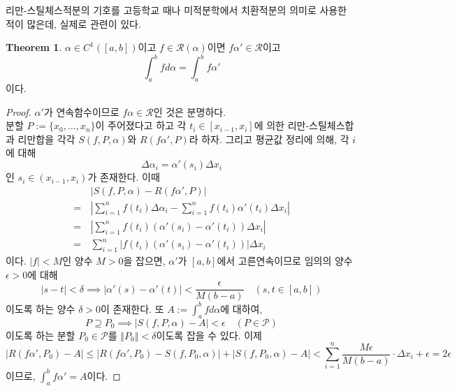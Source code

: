 \documentclass[11pt]{book}
\numberwithin{equation}{chapter}
\def\eps{\epsilon}
\def\calP{\mathcal{P}}
\def\calR{\mathcal{R}}
\newcommand{\abs}[1]{\left\vert#1\right\vert}
\newcommand{\norm}[1]{\left\Vert#1\right\Vert}
\theoremstyle{definition}
\newtheorem{thm}{Theorem}[section]
\begin{document}
리만-스틸체스적분의 기호를 고등학교 때나 미적분학에서 치환적분의 의미로 사용한 적이 많은데, 실제로 관련이 있다.

\begin{thm} \label{9.3.12}
    \(\alpha \in C^1([a, b])\)이고 \(f \in \calR(\alpha)\)이면 \(f \alpha' \in \calR\)이고
    \[
        \int_a^b f d\alpha = \int_a^b f \alpha'
    \]
    이다.
\end{thm}
\begin{proof}
    \(\alpha'\)가 연속함수이므로 \(f\alpha \in \calR\)인 것은 분명하다.\\
    분할 \(P := \{x_0, \ldots, x_n\}\)이 주어졌다고 하고 각 \(t_i \in [x_{i-1}, x_i]\)에 의한 리만-스틸체스합과 리만합을 각각 \(S(f, P, \alpha)\)와 \(R(f\alpha', P)\)라 하자. 그리고 평균값 정리에 의해, 각 \(i\)에 대해
    \[
        \Delta \alpha_i  = \alpha'(s_i) \Delta x_i
    \]
    인 \(s_i \in (x_{i-1}, x_i)\)가 존재한다. 이때
    \begin{align*}
        &\abs{S(f, P, \alpha) - R(f\alpha', P)}\\
        =\,& \abs{\sum_{i=1}^n f(t_i) \Delta\alpha_i - \sum_{i=1}^n f(t_i)\alpha'(t_i) \Delta x_i}\\
        =\,& \abs{\sum_{i=1}^n f(t_i)(\alpha'(s_i) - \alpha'(t_i)) \Delta x_i}\\
        =\,& \sum_{i=1}^n \abs{f(t_i)(\alpha'(s_i) - \alpha'(t_i))} \Delta x_i
    \end{align*}
    이다. \(\abs{f} < M\)인 양수 \(M > 0\)을 잡으면, \(\alpha'\)가 \([a, b]\)에서 고른연속이므로 임의의 양수 \(\eps > 0\)에 대해
    \[
        \abs{s - t} < \delta \implies \abs{\alpha'(s) - \alpha'(t)} < \frac{\eps}{M(b - a)} \quad (s, t \in [a, b])
    \]
    이도록 하는 양수 \(\delta > 0\)이 존재한다. 또 \(\displaystyle A := \int_a^b f d\alpha\)에 대하여,
    \[
        P \supseteq P_0 \implies \abs{S(f, P, \alpha) - A} < \eps \quad (P \in \calP)
    \]
    이도록 하는 분할 \(P_0 \in \calP\)를 \(\norm{P_0} < \delta\)이도록 잡을 수 있다. 이제
    \[
        \abs{R(f\alpha', P_0) - A} \le \abs{R(f\alpha', P_0) - S(f, P_0, \alpha)} + \abs{S(f, P_0, \alpha) - A} < \sum_{i=1}^n \frac{M\eps}{M(b-a)} \cdot \Delta x_i  + \eps = 2\eps
    \]
    이므로, \(\displaystyle \int_a^b f\alpha' = A\)이다.
\end{proof}
\end{document}
